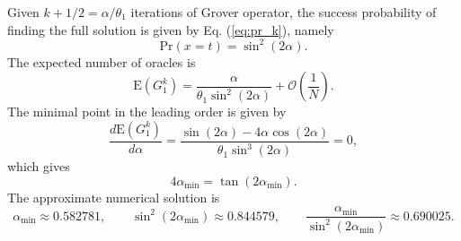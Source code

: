 \documentclass[a4paper,10pt]{article}
\newcommand{\pr}{\mathrm{Pr}}
\newcommand{\E}{\mathrm{E}}
\numberwithin{equation}{section}
\begin{document}
Given $k+1/2 = \alpha/\theta_1$ iterations of Grover operator, the success probability of finding the full solution is given by Eq. (\ref{eq:pr_k}), namely
\begin{equation}
    \pr(x=t) = \sin^2(2\alpha).
\end{equation}
The expected number of oracles is
\begin{equation}
    \E(G_1^k) = \frac{\alpha}{\theta_1\sin^2(2\alpha)} + \mathcal O\left(\frac 1 N\right).
\end{equation}
The minimal point in the leading order is given by
\begin{equation}
    \frac{d\E(G_1^k)}{d\alpha} = \frac{\sin(2\alpha) - 4\alpha\cos(2\alpha)}{\theta_1\sin^3(2\alpha)} = 0,
\end{equation}
which gives
\begin{equation}
    4\alpha_\text{min} = \tan(2\alpha_\text{min}).
\end{equation}
The approximate numerical solution is 
\begin{equation}
    \alpha_\text{min}\approx 0.582781,\qquad \sin^2(2\alpha_\text{min})\approx 0.844579,\qquad \frac{\alpha_\text{min}}{\sin^2(2\alpha_\text{min})}\approx 0.690025.
\end{equation}



\end{document}
